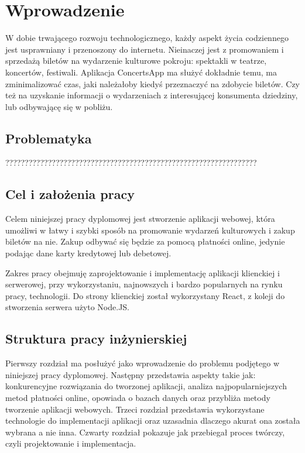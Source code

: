 \documentclass[12pt]{article}
\begin{document}
\begin{sloppypar}


\tableofcontents
\newpage

\section{Wprowadzenie}
{
  W dobie trwającego rozwoju technologicznego, każdy aspekt życia codziennego jest usprawniany i przenoszony
  do internetu. Nieinaczej jest z promowaniem i sprzedażą biletów na wydarzenie kulturowe pokroju:
  spektakli w teatrze, koncertów, festiwali. Aplikacja ConcertsApp ma służyć dokładnie temu,
  ma zminimalizować czas, jaki należałoby kiedyś przeznaczyć na zdobycie biletów. Czy też na uzyskanie
  informacji o wydarzeniach z interesującej konsumenta dziedziny, lub odbywającę się w pobliżu.
\subsection{Problematyka}
{
  ?????????????????????????????????????????????????????????????????
}
\subsection{Cel i założenia pracy}
{
  Celem niniejszej pracy dyplomowej jest stworzenie aplikacji webowej, która umożliwi w łatwy i szybki
  sposób na promowanie wydarzeń kulturowych i zakup biletów na nie. Zakup odbywać się będzie za pomocą
  płatności online, jedynie podając dane karty kredytowej lub debetowej.\par
  Zakres pracy obejmuję zaprojektowanie i implementację aplikacji klienckiej i serwerowej, przy
  wykorzystaniu, najnowszych i bardzo popularnych na rynku pracy, technologii. Do strony klienckiej
  został wykorzystany React, z koleji do stworzenia serwera użyto Node.JS.
}
\subsection{Struktura pracy inżynierskiej}
{
  Pierwszy rozdział ma posłużyć jako wprowadzenie do problemu podjętego w niniejszej pracy dyplomowej.
  Następny przedstawia aspekty takie jak: konkurencyjne rozwiązania do tworzonej aplikacji,
  analiza najpopularniejszych metod płatności online, opowiada o bazach danych oraz przybliża
  metody tworzenie aplikacji webowych.
  Trzeci rozdział przedstawia wykorzystane technologie do implementacji aplikacji oraz uzasadnia dlaczego
  akurat ona została wybrana a nie inna.
  Czwarty rozdział pokazuje jak przebiegał proces twórczy, czyli projektowanie i implementacja.
}
}


\end{sloppypar}
\end{document}
